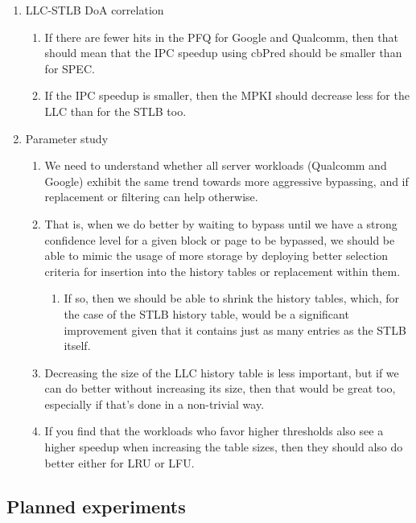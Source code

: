 \documentclass[12pt]{article}
\begin{document}
\begin{enumerate}
  \item LLC-STLB DoA correlation
  \begin{enumerate}
    \item If there are fewer hits in the PFQ for Google and Qualcomm, then that should mean
      that the IPC speedup using cbPred should be smaller than for SPEC.
    \item If the IPC speedup is smaller, then the MPKI should decrease less for the LLC
      than for the STLB too.
  \end{enumerate}
  \item Parameter study 
  \begin{enumerate}
    \item We need to understand whether all server workloads (Qualcomm and Google) exhibit the
      same trend towards more aggressive bypassing, and if replacement or filtering can help otherwise.
    \item That is, when we do better by waiting to bypass until we have a strong confidence level for a
      given block or page to be bypassed, we should be able to mimic the usage of more storage by deploying 
      better selection criteria for insertion into the history tables or replacement within them.
    \begin{enumerate}
      \item If so, then we should be able to shrink the history tables, which, for the case of the STLB history table,
        would be a significant improvement given that it contains just as many entries as the STLB itself.
    \end{enumerate}
    \item Decreasing the size of the LLC history table is less important, but if we can do better without increasing
      its size, then that would be great too, especially if that's done in a non-trivial way.
    \item If you find that the workloads who favor higher thresholds also see a higher speedup when increasing the
      table sizes, then they should also do better either for LRU or LFU.
  \end{enumerate}
\end{enumerate}

\subsection{Planned experiments}
\end{document}
